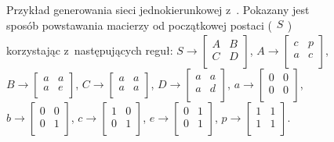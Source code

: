 \begin{figure}
  \centering 
  \caption{
    Przykład generowania sieci jednokierunkowej
    z~.
    Pokazany jest sposób powstawania macierzy
    od początkowej postaci ($\displaystyle
      \begin{matrix}S\\\end{matrix}
    $) korzystając z~następujących reguł:
    $\displaystyle
      S \rightarrow \left[\begin{matrix}
        A & B\\C & D\\
      \end{matrix}\right]
    $, $\displaystyle
      A \rightarrow \left[\begin{matrix}
        c & p\\a & c\\
      \end{matrix}\right]
    $, $\displaystyle
      B \rightarrow \left[\begin{matrix}
        a & a\\a & e\\
      \end{matrix}\right]
    $, $\displaystyle
      C \rightarrow \left[\begin{matrix}
        a & a\\a & a\\
      \end{matrix}\right]
    $, $\displaystyle
      D \rightarrow \left[\begin{matrix}
        a & a\\a & d\\
      \end{matrix}\right]
    $, $\displaystyle
      a \rightarrow \left[\begin{matrix}
        0 & 0\\0 & 0\\
      \end{matrix}\right]
    $, $\displaystyle
      b \rightarrow \left[\begin{matrix}
        0 & 0\\0 & 1\\
      \end{matrix}\right]
    $, $\displaystyle
      c \rightarrow \left[\begin{matrix}
        1 & 0\\0 & 1\\
      \end{matrix}\right]
    $, $\displaystyle
      e \rightarrow \left[\begin{matrix}
        0 & 1\\0 & 1\\
      \end{matrix}\right]
    $, $\displaystyle
      p \rightarrow \left[\begin{matrix}
        1 & 1\\1 & 1\\
      \end{matrix}\right]
    $.
  }
  \label{fig:kitnano1990}
\end{figure}

